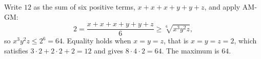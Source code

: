 Write $12$ as the sum of six positive terms, $x+x+x+y+y+z$, and apply AM-GM:
\[
2=\dfrac{x+x+x+y+y+z}{6}\ge\sqrt[6]{x^3y^2z},
\]
so $x^3y^2z\le2^6=64$. Equality holds when $x=y=z$, that is $x=y=z=2$, which satisfies $3\cdot2+2\cdot2+2=12$ and gives $8\cdot4\cdot2=64$. The maximum is $\boxed{64}$.

